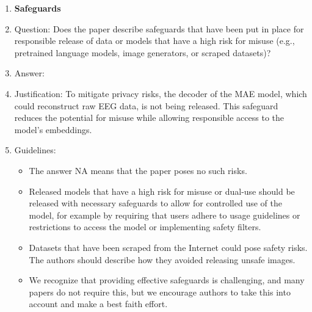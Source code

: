 \documentclass{article}
\begin{document}
\begin{enumerate}
\begin{itemize}
        \item If there are negative societal impacts, the authors could also discuss possible mitigation strategies (e.g., gated release of models, providing defenses in addition to attacks, mechanisms for monitoring misuse, mechanisms to monitor how a system learns from feedback over time, improving the efficiency and accessibility of ML).
    \end{itemize}
    
\item {\bf Safeguards}
    \item[] Question: Does the paper describe safeguards that have been put in place for responsible release of data or models that have a high risk for misuse (e.g., pretrained language models, image generators, or scraped datasets)?
    \item[] Answer: \answerYes{} %
    \item[] Justification: To mitigate privacy risks, the decoder of the MAE model, which could reconstruct raw EEG data, is not being released. This safeguard reduces the potential for misuse while allowing responsible access to the model's embeddings.
    \item[] Guidelines: 
    \begin{itemize}
        \item The answer NA means that the paper poses no such risks.
        \item Released models that have a high risk for misuse or dual-use should be released with necessary safeguards to allow for controlled use of the model, for example by requiring that users adhere to usage guidelines or restrictions to access the model or implementing safety filters. 
        \item Datasets that have been scraped from the Internet could pose safety risks. The authors should describe how they avoided releasing unsafe images.
        \item We recognize that providing effective safeguards is challenging, and many papers do not require this, but we encourage authors to take this into account and make a best faith effort.
    \end{itemize}


\end{enumerate}
\end{document}
